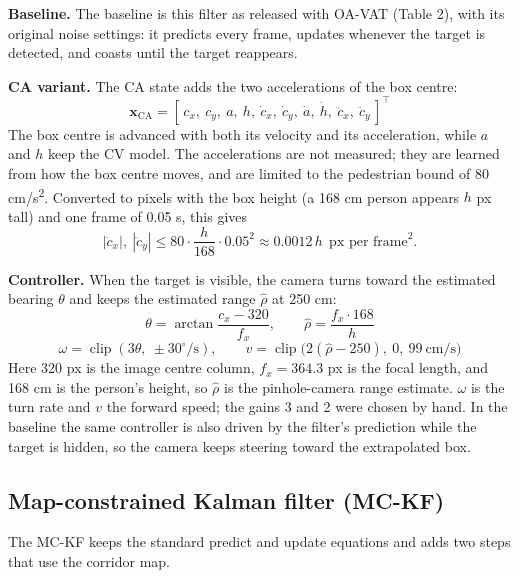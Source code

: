 \documentclass[12pt,a4paper]{article}
\begin{document}
\textbf{Baseline.} The baseline is this filter as released with OA-VAT (Table 2), with its original noise settings: it predicts every frame, updates whenever the target is detected, and coasts until the target reappears.

\textbf{CA variant.} The CA state adds the two accelerations of the box centre:
\begin{equation}
  \mathbf{x}_{\mathrm{CA}} = [\,c_x,\ c_y,\ a,\ h,\ \dot c_x,\ \dot c_y,\ \dot a,\ \dot h,\ \ddot c_x,\ \ddot c_y\,]^{\top}
\end{equation}
The box centre is advanced with both its velocity and its acceleration, while $a$ and $h$ keep the CV model. The accelerations are not measured; they are learned from how the box centre moves, and are limited to the pedestrian bound of 80 cm/s\textsuperscript{2}. Converted to pixels with the box height (a 168 cm person appears $h$ px tall) and one frame of 0.05 s, this gives
\begin{equation}
  |\ddot c_x|,\ |\ddot c_y| \le 80 \cdot \frac{h}{168} \cdot 0.05^2 \approx 0.0012\,h \ \ \text{px per frame}^2.
\end{equation}

\textbf{Controller.} When the target is visible, the camera turns toward the estimated bearing $\theta$ and keeps the estimated range $\hat\rho$ at 250 cm:
\begin{equation}
  \theta = \arctan\frac{c_x-320}{f_x},\qquad \hat{\rho} = \frac{f_x\cdot 168}{h}
\end{equation}
\begin{equation}
  \omega = \operatorname{clip}(3\theta,\ \pm 30^\circ/\mathrm{s}),\qquad v = \operatorname{clip}\big(2(\hat{\rho}-250),\ 0,\ 99\ \mathrm{cm/s}\big)
\end{equation}
Here 320 px is the image centre column, $f_x = 364.3$ px is the focal length, and 168 cm is the person's height, so $\hat\rho$ is the pinhole-camera range estimate. $\omega$ is the turn rate and $v$ the forward speed; the gains 3 and 2 were chosen by hand. In the baseline the same controller is also driven by the filter's prediction while the target is hidden, so the camera keeps steering toward the extrapolated box.

\subsection{Map-constrained Kalman filter (MC-KF)}
The MC-KF keeps the standard predict and update equations and adds two steps that use the corridor map.
\end{document}
